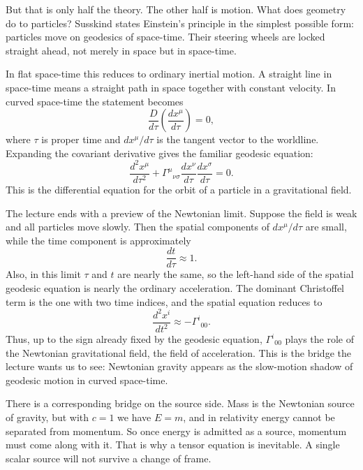 But that is only half the theory. The other half is motion. What does geometry do to particles? Susskind states Einstein's principle in the simplest possible form: particles move on geodesics of space-time. Their steering wheels are locked straight ahead, not merely in space but in space-time.

In flat space-time this reduces to ordinary inertial motion. A straight line in space-time means a straight path in space together with constant velocity. In curved space-time the statement becomes
\begin{equation}
\frac{D}{d\tau}\left(\frac{dx^\mu}{d\tau}\right)=0,
\end{equation}
where \(\tau\) is proper time and \(dx^\mu/d\tau\) is the tangent vector to the worldline. Expanding the covariant derivative gives the familiar geodesic equation:
\begin{equation}
\frac{d^2x^\mu}{d\tau^2}
+
\Gamma^\mu{}_{\nu\sigma}
\frac{dx^\nu}{d\tau}
\frac{dx^\sigma}{d\tau}
=0.
\end{equation}
This is the differential equation for the orbit of a particle in a gravitational field.

The lecture ends with a preview of the Newtonian limit. Suppose the field is weak and all particles move slowly. Then the spatial components of \(dx^\mu/d\tau\) are small, while the time component is approximately
\begin{equation}
\frac{dt}{d\tau}\approx 1.
\end{equation}
Also, in this limit \(\tau\) and \(t\) are nearly the same, so the left-hand side of the spatial geodesic equation is nearly the ordinary acceleration. The dominant Christoffel term is the one with two time indices, and the spatial equation reduces to
\begin{equation}
\frac{d^2x^i}{dt^2}\approx -\Gamma^i{}_{00}.
\end{equation}
Thus, up to the sign already fixed by the geodesic equation, \(\Gamma^i{}_{00}\) plays the role of the Newtonian gravitational field, the field of acceleration. This is the bridge the lecture wants us to see: Newtonian gravity appears as the slow-motion shadow of geodesic motion in curved space-time.

There is a corresponding bridge on the source side. Mass is the Newtonian source of gravity, but with \(c=1\) we have \(E=m\), and in relativity energy cannot be separated from momentum. So once energy is admitted as a source, momentum must come along with it. That is why a tensor equation is inevitable. A single scalar source will not survive a change of frame.

